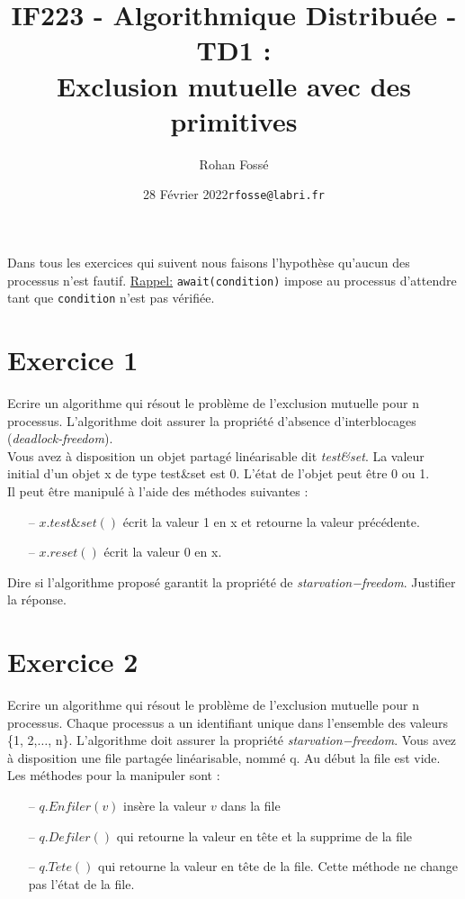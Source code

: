 \documentclass[10pt,a4paper]{article}
\title{IF223 - Algorithmique Distribuée - TD1 :\\ Exclusion mutuelle avec des primitives}
\date{28 Février 2022}
\author{Rohan Fossé}
\date{\texttt{rfosse@labri.fr}}
\begin{document}
\maketitle

Dans tous les exercices qui suivent nous faisons l’hypothèse qu'aucun des processus n'est fautif.
\underline{Rappel:} \texttt{await(condition)} impose au processus d’attendre tant que  \texttt{condition} n’est pas vérifiée.


\section*{Exercice 1}

Ecrire un algorithme qui résout le problème de l’exclusion mutuelle pour n processus. L’algorithme doit assurer la propriété d’absence d’interblocages (\textit{deadlock-freedom}).\\
Vous avez à disposition un objet partagé linéarisable dit \textit{test\&set}. La valeur initial d’un objet x de type test\&set est 0. L’état de l’objet peut être 0 ou 1.\\

Il peut être manipulé à l’aide des méthodes suivantes :
\begin{itemize}
    \item[--] $x.test\&set()$ écrit la valeur 1 en x et retourne la valeur précédente.
    \item[--] $x.reset()$ écrit la valeur 0 en x.
\end{itemize}

Dire si l’algorithme proposé garantit la propriété de \textit{starvation−freedom}. Justifier la réponse.


\section*{Exercice 2}

Ecrire un algorithme qui résout le problème de l’exclusion mutuelle pour n processus. Chaque processus a un identifiant unique dans l’ensemble des valeurs \{1, 2,$\ldots$, n\}. L’algorithme doit assurer la propriété \textit{starvation−freedom}. Vous avez à disposition une file partagée linéarisable, nommé q. Au début la file est vide. Les méthodes pour la manipuler sont :
\begin{itemize}
    \item[--] $q.Enfiler(v)$ insère la valeur $v$ dans la file
    \item[--] $q.Defiler()$ qui retourne la valeur en tête et la supprime de la file
    \item[--] $q.Tete()$ qui retourne la valeur en tête de la file. Cette méthode ne change pas l’état de la file.
\end{itemize}
\end{document}
